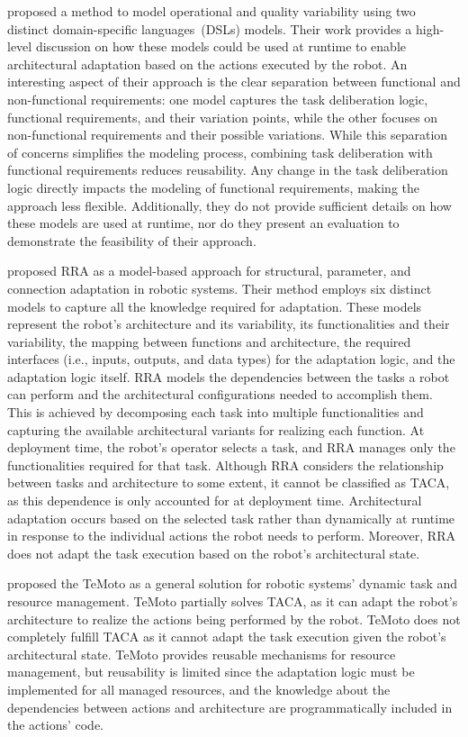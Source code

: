 \mbox{\cite{runtime_variability_lotz}} proposed a method to model operational and quality variability using two distinct domain-specific languages~(DSLs) models. Their work provides a high-level discussion on how these models could be used at runtime to enable architectural adaptation based on the actions executed by the robot. An interesting aspect of their approach is the clear separation between functional and non-functional requirements: one model captures the task deliberation logic, functional requirements, and their variation points, while the other focuses on non-functional requirements and their possible variations.
While this separation of concerns simplifies the modeling process, combining task deliberation with functional requirements reduces reusability. Any change in the task deliberation logic directly impacts the modeling of functional requirements, making the approach less flexible. Additionally, they do not provide sufficient details on how these models are used at runtime, nor do they present an evaluation to demonstrate the feasibility of their approach.

\mbox{\cite{rra_nico}} proposed RRA as a model-based approach for structural, parameter, and connection adaptation in robotic systems. Their method employs six distinct models to capture all the knowledge required for adaptation. These models represent the robot's architecture and its variability, its functionalities and their variability, the mapping between functions and architecture, the required interfaces (i.e., inputs, outputs, and data types) for the adaptation logic, and the adaptation logic itself. RRA  models the dependencies between the tasks a robot can perform and the architectural configurations needed to accomplish them. This is achieved by decomposing each task into multiple functionalities and capturing the available architectural variants for realizing each function. At deployment time, the robot's operator selects a task, and RRA manages only the functionalities required for that task. Although RRA considers the relationship between tasks and architecture to some extent, it cannot be classified as TACA, as this dependence is only accounted for at deployment time. Architectural adaptation occurs based on the selected task rather than dynamically at runtime in response to the individual actions the robot needs to perform. Moreover, RRA does not adapt the task execution based on the robot's architectural state.

\cite{temoto} proposed the TeMoto as a general solution for robotic systems' dynamic task and resource management. TeMoto partially solves TACA, as it can adapt the robot's architecture to realize the actions being performed by the robot. TeMoto does not completely fulfill TACA as it cannot adapt the task execution given the robot's architectural state. TeMoto provides reusable mechanisms for resource management, but reusability is limited since the adaptation logic must be implemented for all managed resources, and the knowledge about the dependencies between actions and architecture are programmatically included in the actions' code. %

